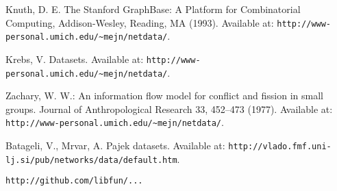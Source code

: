 \documentclass{llncs}
\begin{document}
\begin{thebibliography}{}
Knuth, D. E.
The Stanford GraphBase: A Platform for Combinatorial Computing, Addison-Wesley, Reading, MA (1993).
Available at: \texttt{http://www-personal.umich.edu/\~{}mejn/netdata/}.

Krebs, V.
Datasets. 
Available at: \texttt{http://www-personal.umich.edu/\~{}mejn/netdata/}.

Zachary, W. W.:
An information flow model for conflict and fission in small groups.
Journal of Anthropological Research 33, 452--473 (1977). 
Available at: \texttt{http://www-personal.umich.edu/\~{}mejn/netdata/}.

Batageli, V., Mrvar, A.
Pajek datasets. 
Available at: \texttt{http://vlado.fmf.uni-lj.si/pub/networks/data/default.htm}.

\texttt{http://github.com/libfun/...}

\end{thebibliography}
\end{document}
